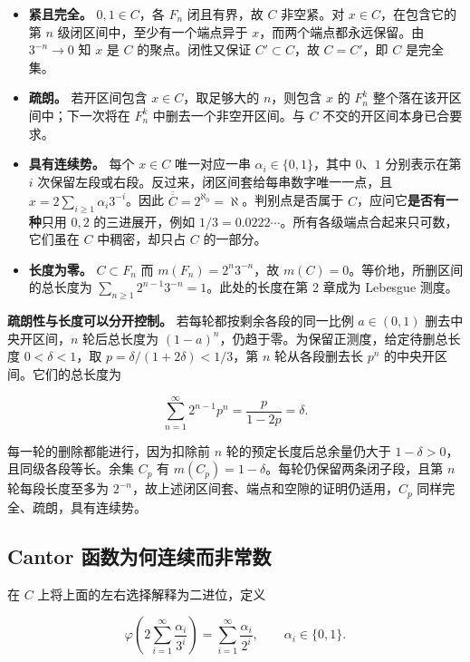 \documentclass[11pt,a4paper]{article}
\providecommand{\tightlist}{\setlength{\itemsep}{3pt}\setlength{\parskip}{0pt}}
\begin{document}
\begin{itemize}
\tightlist
\item
  \textbf{紧且完全。} \(0,1\in C\)，各 \(F_n\) 闭且有界，故 \(C\) 非空紧。对 \(x\in C\)，在包含它的第 \(n\) 级闭区间中，至少有一个端点异于 \(x\)，而两个端点都永远保留。由 \(3^{-n}\to0\) 知 \(x\) 是 \(C\) 的聚点。闭性又保证 \(C'\subset C\)，故 \(C=C'\)，即 \(C\) 是完全集。
\item
  \textbf{疏朗。} 若开区间包含 \(x\in C\)，取足够大的 \(n\)，则包含 \(x\) 的 \(F_n^k\) 整个落在该开区间中；下一次将在 \(F_n^k\) 中删去一个非空开区间。与 \(C\) 不交的开区间本身已合要求。
\item
  \textbf{具有连续势。} 每个 \(x\in C\) 唯一对应一串 \(\alpha_i\in\{0,1\}\)，其中 \(0\)、\(1\) 分别表示在第 \(i\) 次保留左段或右段。反过来，闭区间套给每串数字唯一一点，且 \(x=2\sum_{i\geq1}\alpha_i3^{-i}\)。因此 \(\overline{\overline C}=2^{\aleph_0}=\aleph\)。判别点是否属于 \(C\)，应问它\textbf{是否有一种}只用 \(0,2\) 的三进展开，例如 \(1/3=0.0222\cdots\)。所有各级端点合起来只可数，它们虽在 \(C\) 中稠密，却只占 \(C\) 的一部分。
\item
  \textbf{长度为零。} \(C\subset F_n\) 而 \(m(F_n)=2^n3^{-n}\)，故 \(m(C)=0\)。等价地，所删区间的总长度为 \(\sum_{n\geq1}2^{n-1}3^{-n}=1\)。此处的长度在第 2 章成为 Lebesgue 测度。
\end{itemize}

\textbf{疏朗性与长度可以分开控制。} 若每轮都按剩余各段的同一比例 \(a\in(0,1)\) 删去中央开区间，\(n\) 轮后总长度为 \((1-a)^n\)，仍趋于零。为保留正测度，给定待删总长度 \(0<\delta<1\)，取 \(p=\delta/(1+2\delta)<1/3\)，第 \(n\) 轮从各段删去长 \(p^n\) 的中央开区间。它们的总长度为

\[
\sum_{n=1}^{\infty}2^{n-1}p^n=\frac p{1-2p}=\delta.
\]

每一轮的删除都能进行，因为扣除前 \(n\) 轮的预定长度后总余量仍大于 \(1-\delta>0\)，且同级各段等长。余集 \(C_p\) 有 \(m(C_p)=1-\delta\)。每轮仍保留两条闭子段，且第 \(n\) 轮每段长度至多为 \(2^{-n}\)，故上述闭区间套、端点和空隙的证明仍适用，\(C_p\) 同样完全、疏朗，具有连续势。

\subsection{Cantor 函数为何连续而非常数}

在 \(C\) 上将上面的左右选择解释为二进位，定义

\[
\varphi\!\left(2\sum_{i=1}^{\infty}\frac{\alpha_i}{3^i}\right)
=\sum_{i=1}^{\infty}\frac{\alpha_i}{2^i},\qquad \alpha_i\in\{0,1\}.
\]
\end{document}
